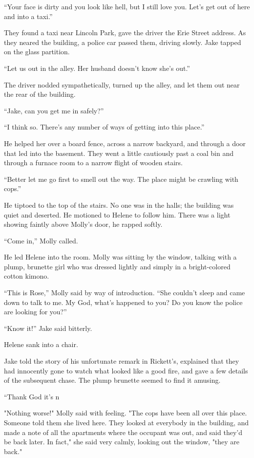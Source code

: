 \documentclass{novel}
\begin{document}
“Your face is dirty and you look like hell, but I still love you. Let’s get out of here and into a taxi.”

They found a taxi near Lincoln Park, gave the driver the Erie Street address. As they neared the building, a police car passed them, driving slowly. Jake tapped on the glass partition.

“Let us out in the alley. Her husband doesn’t know she’s out.”

The driver nodded sympathetically, turned up the alley, and let them out near the rear of the building.

“Jake, can you get me in safely?”

“I think so. There’s any number of ways of getting into this place.”

He helped her over a board fence, across a narrow backyard, and through a door that led into the basement. They went a little cautiously past a coal bin and through a furnace room to a narrow flight of wooden stairs.

“Better let me go first to smell out the way. The place might be crawling with cops.”

He tiptoed to the top of the stairs. No one was in the halls; the building was quiet and deserted. He motioned to Helene to follow him. There was a light showing faintly above Molly’s door, he rapped softly.

“Come in,” Molly called.

He led Helene into the room. Molly was sitting by the window, talking with a plump, brunette girl who was dressed lightly and simply in a bright-colored cotton kimono.

“This is Rose,” Molly said by way of introduction. “She couldn’t sleep and came down to talk to me. My God, what’s happened to you? Do you know the police are looking for you?”

“Know it!” Jake said bitterly.

Helene sank into a chair.

Jake told the story of his unfortunate remark in Rickett’s, explained that they had innocently gone to watch what looked like a good fire, and gave a few details of the subsequent chase. The plump brunette seemed to find it amusing.

“Thank God it’s n

"Nothing worse!" Molly said with feeling. "The cops have been all over this place. Someone told them she lived here. They looked at everybody in the building, and made a note of all the apartments where the occupant was out, and said they’d be back later. In fact," she said very calmly, looking out the window, "they are back."
\end{document}
